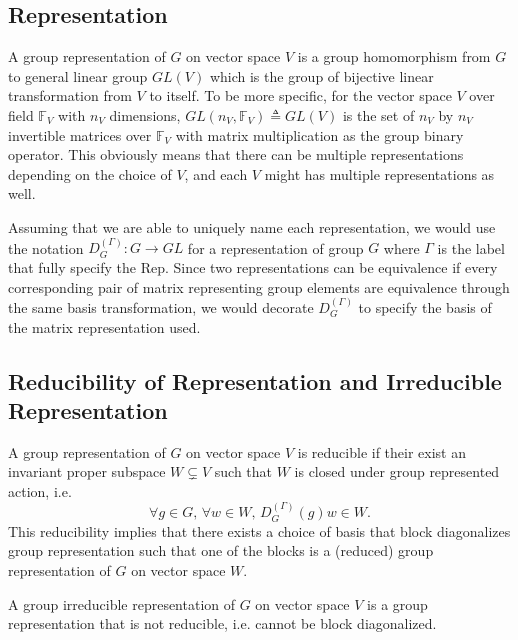 \documentclass[preprint, 12pt]{revtex4-2}
\numberwithin{equation}{section}
\begin{document}
\subsection{Representation}
A group representation of $G$ on vector space $V$ is a group homomorphism from $G$ to general linear group $GL(V)$ which is the group of bijective linear transformation from $V$ to itself. To be more specific, for the vector space $V$ over field $\mathbb{F}_V$ with $n_V$ dimensions, $GL(n_V, \mathbb{F}_V)\triangleq GL(V)$ is the set of $n_V$ by $n_V$ invertible matrices over $\mathbb{F}_V$ with matrix multiplication as the group binary operator. This obviously means that there can be multiple representations depending on the choice of $V$, and each $V$ might has multiple representations as well. 

Assuming that we are able to uniquely name each representation, we would use the notation $D_{G}^{(\Gamma)}:G\rightarrow GL$ for a representation of group $G$ where $\Gamma$ is the label that fully specify the Rep. Since two representations can be equivalence if every corresponding pair of matrix representing group elements are equivalence through the same basis transformation, we would decorate $D_{G}^{(\Gamma)}$ to specify the basis of the matrix representation used.

\subsection{Reducibility of Representation and Irreducible Representation}
A group representation of $G$ on vector space $V$ is reducible if their exist an invariant proper subspace $W\subsetneq V$ such that $W$ is closed under group represented action, i.e.
\begin{equation}\label{eq:invariant subspace}
    \forall g\in G,\,\forall w\in W,\, D_{G}^{(\Gamma)}(g)w\in W.
\end{equation}
This reducibility implies that there exists a choice of basis that block diagonalizes group representation such that one of the blocks is a (reduced) group representation of $G$ on vector space $W$.

A group irreducible representation of $G$ on vector space $V$ is a group representation that is not reducible, i.e. cannot be block diagonalized.
\end{document}
